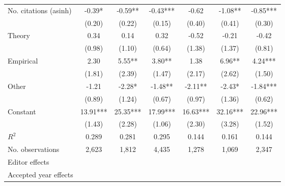 \begin{table}
\begin{threeparttable}
\begin{tabular}{p{3.78cm}S@{}S@{}S@{}S@{}S@{}S@{}}
            No. citations (asinh)         &       -0.39*  &       -0.59** &       -0.43***&       -0.62   &       -1.08** &       -0.85***\\
                                          &      (0.20)   &      (0.22)   &      (0.15)   &      (0.40)   &      (0.41)   &      (0.30)   \\
            Theory                        &        0.34   &        0.14   &        0.32   &       -0.52   &       -0.21   &       -0.42   \\
                                          &      (0.98)   &      (1.10)   &      (0.64)   &      (1.38)   &      (1.37)   &      (0.81)   \\
            Empirical                     &        2.30   &        5.55** &        3.80** &        1.38   &        6.96** &        4.24***\\
                                          &      (1.81)   &      (2.39)   &      (1.47)   &      (2.17)   &      (2.62)   &      (1.50)   \\
            Other                         &       -1.21   &       -2.28*  &       -1.48** &       -2.11** &       -2.43*  &       -1.84***\\
                                          &      (0.89)   &      (1.24)   &      (0.67)   &      (0.97)   &      (1.36)   &      (0.62)   \\
            Constant                      &       13.91***&       25.35***&       17.99***&       16.63***&       32.16***&       22.96***\\
                                          &      (1.43)   &      (2.28)   &      (1.06)   &      (2.30)   &      (3.28)   &      (1.52)   \\
            \midrule
            \(R^2\)                       &       0.289   &       0.281   &       0.295   &       0.144   &       0.161   &       0.144   \\
            No. observations              &       2,623   &       1,812   &       4,435   &       1,278   &       1,069   &       2,347   \\
            \midrule
            Editor effects       &           {}   &           {}   &           {}   &           {}   &           {}   &           {}   \\
            Accepted year effects         &           {}   &           {}   &               &           {}   &           {}   &               \\

\end{tabular}
\end{threeparttable}
\end{table}
